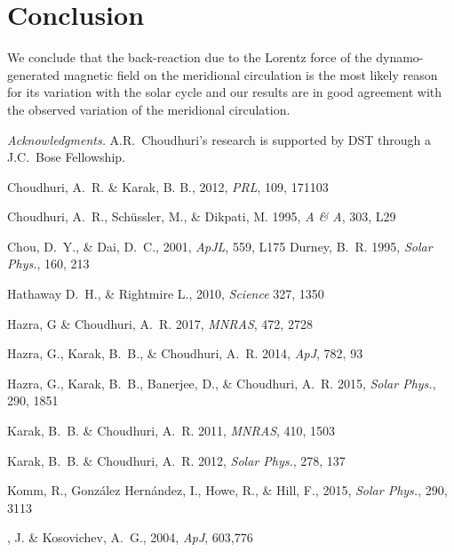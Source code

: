 \documentclass{iau}
\begin{document}
\section{Conclusion}

We conclude that the back-reaction due to the Lorentz force of the dynamo-generated magnetic field
on the meridional circulation is the most likely reason for its variation with the solar cycle and 
our results are in good agreement with the observed variation of the meridional circulation.

{\it Acknowledgments.} A.R.\ Choudhuri's
research is supported by DST through 
a J.C.\ Bose Fellowship.


\begin{thebibliography}{}

Choudhuri, A.\ R. \& Karak, B. B., 2012, \textit{PRL}, 109, 171103

{Choudhuri}, A.~R., {Sch\"ussler}, M., \& {Dikpati}, M. 1995, \textit{A \& A}, 303, L29

{Chou}, D.~Y.,  \& {Dai}, D.~C.,  2001, \textit{ApJL}, {559, L175}
{Durney}, B.~R. 1995, \textit{Solar Phys.}, 160, 213

{Hathaway} D.~H., \& {Rightmire} L.,  2010, \textit{Science} {327, 1350}

Hazra, G \& Choudhuri, A.\ R. 2017, \textit{MNRAS}, 472, 2728

{Hazra}, G., {Karak}, B.~B., \& {Choudhuri}, A.~R. 2014, \textit{ApJ}, 782, 93

{Hazra}, G., {Karak}, B.~B., Banerjee, D., \& {Choudhuri}, A.~R. 2015, \textit{Solar Phys.}, 290, 1851

{Karak}, B.~B. \& {Choudhuri}, A.~R. 2011, \textit{MNRAS}, 410, 1503

{Karak}, B.~B. \& {Choudhuri}, A.~R. 2012, \textit{Solar Phys.}, 278, 137

{Komm}, R.,  {Gonz{\'a}lez Hern{\'a}ndez}, I.,  {Howe}, R.,  \& {Hill}, F.,  2015, \textit{Solar Phys.}, {290, 3113}

, J. \& Kosovichev, A.~G., 2004, \textit{ApJ}, {603,776}
\end{thebibliography}
\end{document}
